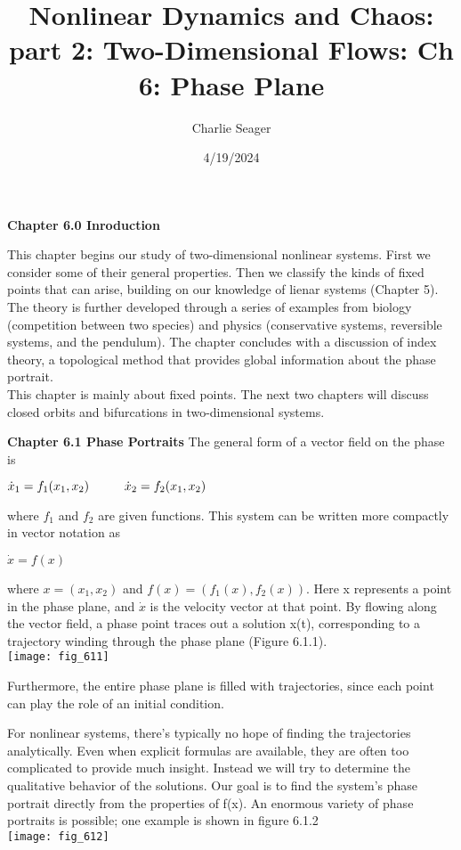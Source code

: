 \documentclass{article}
\newcommand\tab[1][1cm]{\hspace*{#1}}
\begin{document}
\title {Nonlinear Dynamics and Chaos: part 2: Two-Dimensional Flows: Ch 6: Phase Plane}

\author{Charlie Seager}

\date{4/19/2024}

\maketitle

\textbf {Chapter 6.0 Inroduction}

This chapter begins our study of two-dimensional nonlinear systems. First we consider some of their general properties. Then we classify the kinds of fixed points that can arise, building on our knowledge of lienar systems (Chapter 5). The theory is further developed through a series of examples from biology (competition between two species) and physics (conservative systems, reversible systems, and the pendulum). The chapter concludes with a discussion of index theory, a topological method that provides global information about the phase portrait. \\ \tab
This chapter is mainly about fixed points. The next two chapters will discuss closed orbits and bifurcations in two-dimensional systems.

\textbf {Chapter 6.1 Phase Portraits}
The general form of a vector field on the phase is
\begin{center}
$\dot{x}_{1}=f_{1}(x_{1},x_{2}) \tab \dot{x}_{2}=f_{2}(x_{1}, x_{2})$
\end{center}
where $f_{1}$ and $f_{2}$ are given functions. This system can be written more compactly in vector notation as
\begin{center}
$\dot{x}=f(x)$
\end{center}

where $x=(x_{1},x_{2})$ and $f(x)=(f_{1}(x), f_{2}(x))$. Here x represents a point in the phase plane, and $\dot{x}$ is the velocity vector at that point. By flowing along the vector field, a phase point traces out a solution x(t), corresponding to a trajectory winding through the phase plane (Figure 6.1.1).\\

\texttt{[image: fig\_611]} 

Furthermore, the entire phase plane is filled with trajectories, since each point can play the role of an initial condition. \\ \tab

For nonlinear systems, there's typically no hope of finding the trajectories analytically. Even when explicit formulas are available, they are often too complicated to provide much insight. Instead we will try to determine the qualitative behavior of the solutions. Our goal is to find the system's phase portrait directly from the properties of f(x). An enormous variety of phase portraits is possible; one example is shown in figure 6.1.2
 \\
\texttt{[image: fig\_612]}
\end{document}

